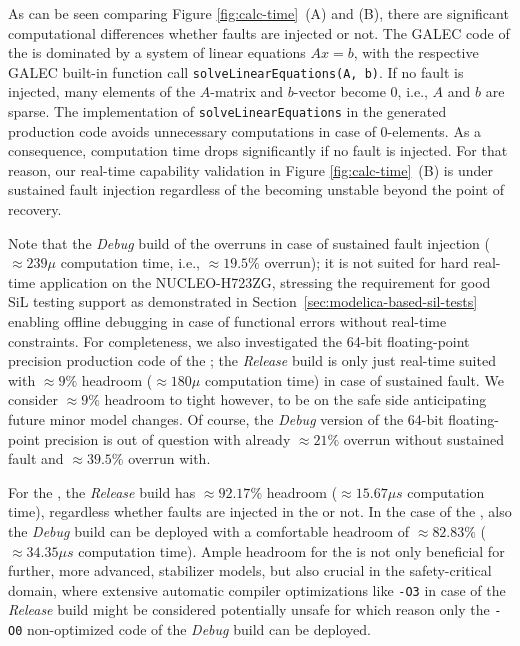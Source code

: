 As can be seen comparing Figure \ref{fig:calc-time}~(A) and (B), there are significant computational differences whether faults are injected or not. The GALEC code of the \plant{} is dominated by a system of linear equations $Ax=b$, with the respective GALEC built-in function call \texttt{solveLinearEquations(A, b)}. If no fault is injected, many elements of the $A$-matrix and $b$-vector become 0, i.e., $A$ and $b$ are sparse. The implementation of \texttt{solveLinearEquations} in the generated production code avoids unnecessary computations in case of 0-elements. As a consequence, computation time drops significantly if no fault is injected. For that reason, our real-time capability validation in Figure \ref{fig:calc-time}~(B) is under sustained fault injection regardless of the \plant{} becoming unstable beyond the point of recovery.

Note that the \textit{Debug} build of the \plant{} overruns in case of sustained fault injection (${\approx}239\mu$ computation time, i.e., ${\approx}19.5\%$ overrun); it is not suited for hard real-time application on the NUCLEO-H723ZG, stressing the requirement for good SiL testing support as demonstrated in Section~\ref{sec:modelica-based-sil-tests} enabling offline debugging in case of functional errors without real-time constraints. For completeness, we also investigated the 64-bit floating-point precision production code of the \plant{}; the \textit{Release} build is only just real-time suited with ${\approx}9\%$ headroom (${\approx}180\mu$ computation time) in case of sustained fault. We consider ${\approx}9\%$ headroom to tight however, to be on the safe side anticipating future minor model changes. Of course, the \textit{Debug} version of the 64-bit floating-point precision \plant{} is out of question with already ${\approx}21\%$ overrun without sustained fault and ${\approx}39.5\%$ overrun with.

For the \controller{}, the \textit{Release} build has ${\approx}92.17\%$ headroom (${\approx}15.67\mu{}s$ computation time), regardless whether faults are injected in the \plant{} or not. In the case of the \controller{}, also the \textit{Debug} build can be deployed with a comfortable headroom of ${\approx}82.83\%$ (${\approx}34.35\mu{}s$ computation time). Ample headroom for the \controller{} is not only beneficial for further, more advanced, stabilizer models, but also crucial in the safety-critical domain, where extensive automatic compiler optimizations like \texttt{-O3} in case of the \textit{Release} build might be considered potentially unsafe for which reason only the \texttt{-O0} non-optimized code of the \textit{Debug} build can be deployed.
